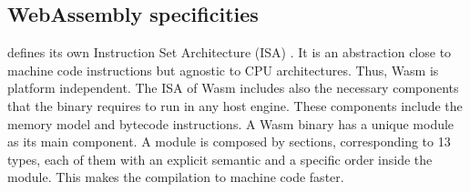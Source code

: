








\subsection*{WebAssembly specificities}

\wasm defines its own Instruction Set Architecture (ISA) \cite{wasm_spec}. It is an abstraction close to machine code instructions but agnostic to CPU architectures. Thus, Wasm is platform independent. The ISA of Wasm includes also the necessary components that the binary requires to run in any host engine. These components include the memory model and bytecode instructions.
A Wasm binary has a unique module as its main component. A module is composed by sections, corresponding to 13 types, each of them with an explicit semantic and a specific order inside the module. This makes the compilation to machine code faster. %


